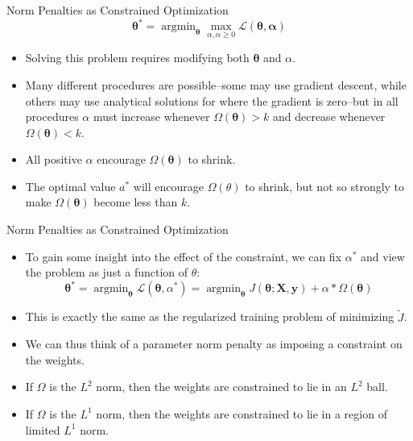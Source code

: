 \documentclass[10pt]{beamer}
\begin{document}
	\begin{frame}{Norm Penalties as Constrained Optimization}
		$$\bm{\theta}^*=\mathop{\arg\min}_{\bm{\theta}}\mathop{\max}_{\alpha,\alpha\geq0}\mathcal{L}(\bm{\theta,\alpha}) $$
		
		\begin{itemize}
			\item Solving this problem requires modifying both $\bm{\theta}$ and $\alpha$.
			\pause
			\item Many different procedures are possible--some may use gradient descent, while others may use analytical solutions for where the gradient is zero--but in all procedures $\alpha$ must increase whenever $\Omega(\bm{\theta})>k$ and decrease whenever $\Omega(\bm{\theta})<k$.
			\pause
			\item All positive $\alpha$ encourage $\Omega(\bm{\theta})$ to shrink.
			\pause
			\item The optimal value $a^*$ will encourage $\Omega(\theta)$ to shrink, but not so strongly to make $\Omega(\bm{\theta})$ become less than $k$.
		\end{itemize}
	\end{frame}
	
	\begin{frame}{Norm Penalties as Constrained Optimization}
		\begin{itemize}
			\item To gain some insight into the effect of the constraint, we can fix $\alpha^*$ and view the problem as just a function of $\theta$:
			$$\bm{\theta}^*=\mathop{\arg\min}_{\bm{\theta}}\mathcal{L}(\bm{\theta}, \alpha^*)=\mathop{\arg\min}_{\bm{\theta}}J(\bm{\theta};\bm{X},\bm{y})+\alpha*\Omega(\bm{\theta})$$
			
			\item This is exactly the same as the regularized training problem of minimizing $\tilde{J}$.
			
			\pause
			\item We can thus think of a parameter norm penalty as imposing a constraint on the weights.
			\pause
			\item If $\Omega$ is the $L^2$ norm, then the weights are constrained to lie in an $L^2$ ball.
			\pause
			\item If $\Omega$ is the $L^1$ norm, then the weights are constrained to lie in a region of limited $L^1$ norm.
			
		\end{itemize}
	\end{frame}
\end{document}
